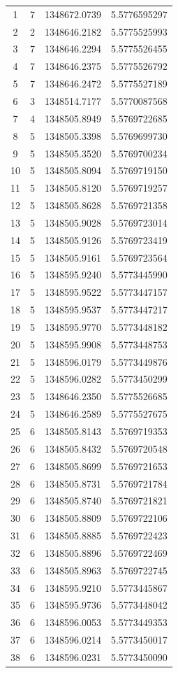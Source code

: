 \begin{longtable}{cccc}
    1 & 7 & 1348672.0739 & 5.5776595297\\
    2 & 2 & 1348646.2182 & 5.5775525993\\
    3 & 7 & 1348646.2294 & 5.5775526455\\
    4 & 7 & 1348646.2375 & 5.5775526792\\
    5 & 7 & 1348646.2472 & 5.5775527189\\
    6 & 3 & 1348514.7177 & 5.5770087568\\
    7 & 4 & 1348505.8949 & 5.5769722685\\
    8 & 5 & 1348505.3398 & 5.5769699730\\
    9 & 5 & 1348505.3520 & 5.5769700234\\
    10 & 5 & 1348505.8094 & 5.5769719150\\
    11 & 5 & 1348505.8120 & 5.5769719257\\
    12 & 5 & 1348505.8628 & 5.5769721358\\
    13 & 5 & 1348505.9028 & 5.5769723014\\
    14 & 5 & 1348505.9126 & 5.5769723419\\
    15 & 5 & 1348505.9161 & 5.5769723564\\
    16 & 5 & 1348595.9240 & 5.5773445990\\
    17 & 5 & 1348595.9522 & 5.5773447157\\
    18 & 5 & 1348595.9537 & 5.5773447217\\
    19 & 5 & 1348595.9770 & 5.5773448182\\
    20 & 5 & 1348595.9908 & 5.5773448753\\
    21 & 5 & 1348596.0179 & 5.5773449876\\
    22 & 5 & 1348596.0282 & 5.5773450299\\
    23 & 5 & 1348646.2350 & 5.5775526685\\
    24 & 5 & 1348646.2589 & 5.5775527675\\
    25 & 6 & 1348505.8143 & 5.5769719353\\
    26 & 6 & 1348505.8432 & 5.5769720548\\
    27 & 6 & 1348505.8699 & 5.5769721653\\
    28 & 6 & 1348505.8731 & 5.5769721784\\
    29 & 6 & 1348505.8740 & 5.5769721821\\
    30 & 6 & 1348505.8809 & 5.5769722106\\
    31 & 6 & 1348505.8885 & 5.5769722423\\
    32 & 6 & 1348505.8896 & 5.5769722469\\
    33 & 6 & 1348505.8963 & 5.5769722745\\
    34 & 6 & 1348595.9210 & 5.5773445867\\
    35 & 6 & 1348595.9736 & 5.5773448042\\
    36 & 6 & 1348596.0053 & 5.5773449353\\
    37 & 6 & 1348596.0214 & 5.5773450017\\
    38 & 6 & 1348596.0231 & 5.5773450090\\
\end{longtable}
